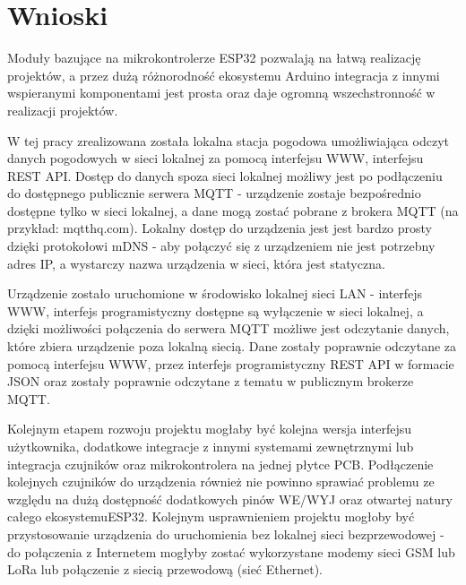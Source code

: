 \documentclass[12pt,a4paper]{article}
\begin{document}



\section{Wnioski}
Moduły bazujące na mikrokontrolerze ESP32 pozwalają na łatwą realizację projektów, a przez dużą różnorodność ekosystemu Arduino integracja z innymi wspieranymi komponentami jest prosta oraz daje ogromną wszechstronność w realizacji projektów.

W tej pracy zrealizowana została lokalna stacja pogodowa umożliwiająca odczyt danych pogodowych w sieci lokalnej za pomocą interfejsu WWW, interfejsu REST API. Dostęp do danych spoza sieci lokalnej możliwy jest po podłączeniu do dostępnego publicznie serwera MQTT - urządzenie zostaje bezpośrednio dostępne tylko w sieci lokalnej, a dane mogą zostać pobrane z brokera MQTT (na przykład: mqtthq.com). Lokalny dostęp do urządzenia jest jest bardzo prosty dzięki protokołowi mDNS - aby połączyć się z urządzeniem nie jest potrzebny adres IP, a wystarczy nazwa urządzenia w sieci, która jest statyczna.

Urządzenie zostało uruchomione w środowisko lokalnej sieci LAN - interfejs WWW, interfejs programistyczny dostępne są wyłączenie w sieci lokalnej, a dzięki możliwości połączenia do serwera MQTT możliwe jest odczytanie danych, które zbiera urządzenie poza lokalną siecią. Dane zostały poprawnie odczytane za pomocą interfejsu WWW, przez interfejs programistyczny REST API w formacie JSON oraz zostały poprawnie odczytane z tematu w publicznym brokerze MQTT.

Kolejnym etapem rozwoju projektu mogłaby być kolejna wersja interfejsu użytkownika, dodatkowe integracje z innymi systemami zewnętrznymi lub integracja czujników oraz mikrokontrolera na jednej płytce PCB. Podłączenie kolejnych czujników do urządzenia również nie powinno sprawiać problemu ze względu na dużą dostępność dodatkowych pinów WE/WYJ oraz otwartej natury całego ekosystemuESP32. Kolejnym usprawnieniem projektu mogłoby być przystosowanie urządzenia do uruchomienia bez lokalnej sieci bezprzewodowej - do połączenia z Internetem mogłyby zostać wykorzystane modemy sieci GSM lub LoRa lub połączenie z siecią przewodową (sieć Ethernet).
\end{document}
